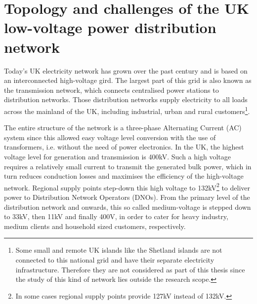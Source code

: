 \section{Topology and challenges of the UK low-voltage power distribution network}
\label{ch-literature:sec:topology-of-lv-network}

Today's UK electricity network has grown over the past century and is based on an interconnected high-voltage gird.
The largest part of this grid is also known as the transmission network, which connects centralised power stations to distribution networks.
Those distribution networks supply electricity to all loads across the mainland of the UK, including industrial, urban and rural customers\footnote[1]{Some small and remote UK islands like the Shetland islands are not connected to this national grid and have their separate electricity infrastructure. Therefore they are not considered as part of this thesis since the study of this kind of network lies outside the research scope.}.

The entire structure of the network is a three-phase Alternating Current (AC) system since this allowed easy voltage level conversion with the use of transformers, i.e. without the need of power electronics.
In the UK, the highest voltage level for generation and transmission is 400kV.
Such a high voltage requires a relatively small current to transmit the generated bulk power, which in turn reduces conduction losses and maximises the efficiency of the high-voltage network.
Regional supply points step-down this high voltage to 132kV\footnote[1]{In some cases regional supply points provide 127kV instead of 132kV.} to deliver power to Distribution Network Operators (DNOs).
From the primary level of the distribution network and onwards, this so called medium-voltage is stepped down to 33kV, then 11kV and finally 400V, in order to cater for heavy industry, medium clients and household sized customers, respectively.


